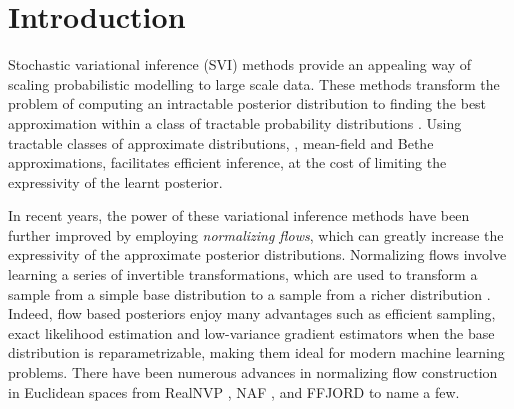\section{Introduction}
Stochastic variational inference (SVI) methods provide an appealing way of scaling probabilistic modelling to large scale data.
These methods transform the problem of computing an intractable posterior distribution to finding the best approximation within a class of tractable probability distributions \cite{hoffman2013stochastic}.
Using tractable classes of approximate distributions, \eg, mean-field and Bethe approximations, facilitates efficient inference, at the cost of limiting the expressivity of the learnt posterior. 

In recent years, the power of these variational inference methods have been further improved by employing {\em normalizing flows}, which can greatly increase the expressivity of the approximate posterior distributions. 
Normalizing flows involve learning a series of invertible transformations, which are used to transform a sample from a simple base distribution to a sample from a richer distribution \cite{rezende2015variational}. 
Indeed, flow based posteriors enjoy many advantages such as efficient sampling, exact likelihood estimation and low-variance gradient estimators when the base distribution is reparametrizable, making them ideal for modern machine learning problems.
There have been numerous advances in normalizing flow construction in Euclidean spaces from RealNVP \cite{dinh2016density}, NAF \cite{huang2018neural}, and FFJORD \cite{grathwohl2018ffjord} to name a few.

